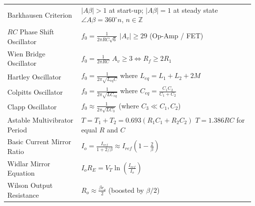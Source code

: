\documentclass[12pt,a4paper]{article}
\renewcommand{\arraystretch}{1.45}
\begin{document}
\begin{tcolorbox}[formulabox, title={Key Formulas at a Glance}]
\small
\renewcommand{\arraystretch}{1.35}
\setlength{\tabcolsep}{5pt}
\noindent\begin{tabularx}{\linewidth}{B{4.1cm}Y}
Barkhausen Criterion & $|A\beta| > 1$ at start-up; $|A\beta| = 1$ at steady state \newline $\angle A\beta = 360^\circ n$, $n \in \mathbb{Z}$ \\[3pt]
$RC$ Phase Shift Oscillator & $f_0 = \frac{1}{2\pi RC\sqrt{6}}$ \newline $|A_v| \ge 29$ (Op-Amp / FET) \\[3pt]
Wien Bridge Oscillator & $f_0 = \frac{1}{2\pi RC}$ \newline $A_v \ge 3 \iff R_f \ge 2R_1$ \\[3pt]
Hartley Oscillator & $f_0 = \frac{1}{2\pi \sqrt{L_{eq}C}}$ where $L_{eq} = L_1 + L_2 + 2M$ \\[3pt]
Colpitts Oscillator & $f_0 = \frac{1}{2\pi \sqrt{L C_{eq}}}$ where $C_{eq} = \frac{C_1 C_2}{C_1 + C_2}$ \\[3pt]
Clapp Oscillator & $f_0 \approx \frac{1}{2\pi \sqrt{L C_3}}$ (where $C_3 \ll C_1, C_2$) \\[3pt]
Astable Multivibrator Period & $T = T_1 + T_2 = 0.693(R_1 C_1 + R_2 C_2)$ \newline $T = 1.386 RC$ for equal $R$ and $C$ \\[3pt]
Basic Current Mirror Ratio & $I_o = \frac{I_{ref}}{1 + 2/\beta} \approx I_{ref}\left(1 - \frac{2}{\beta}\right)$ \\[3pt]
Widlar Mirror Equation & $I_o R_E = V_T \ln\left(\frac{I_{ref}}{I_o}\right)$ \\[3pt]
Wilson Output Resistance & $R_o \approx \frac{\beta r_o}{2}$ (boosted by $\beta/2$)
\end{tabularx}\par
\end{tcolorbox}
\end{document}
